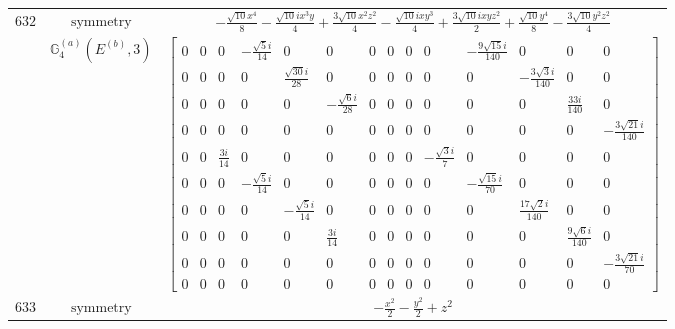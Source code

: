 \documentclass[fleqn,8pt,landscape]{jsarticle}
\begin{document}
\begin{longtable}{ccc}
$ 632 $ & $ \text{symmetry} $ & $ - \frac{\sqrt{10} x^{4}}{8} - \frac{\sqrt{10} i x^{3} y}{4} + \frac{3 \sqrt{10} x^{2} z^{2}}{4} - \frac{\sqrt{10} i x y^{3}}{4} + \frac{3 \sqrt{10} i x y z^{2}}{2} + \frac{\sqrt{10} y^{4}}{8} - \frac{3 \sqrt{10} y^{2} z^{2}}{4} $ \\
$  $ & $ \mathbb{G}_{4}^{(a)}(E^{(b)},3) $ & $ \begin{bmatrix} 0 & 0 & 0 & - \frac{\sqrt{5} i}{14} & 0 & 0 & 0 & 0 & 0 & 0 & - \frac{9 \sqrt{15} i}{140} & 0 & 0 & 0 \\ 0 & 0 & 0 & 0 & \frac{\sqrt{30} i}{28} & 0 & 0 & 0 & 0 & 0 & 0 & - \frac{3 \sqrt{3} i}{140} & 0 & 0 \\ 0 & 0 & 0 & 0 & 0 & - \frac{\sqrt{6} i}{28} & 0 & 0 & 0 & 0 & 0 & 0 & \frac{33 i}{140} & 0 \\ 0 & 0 & 0 & 0 & 0 & 0 & 0 & 0 & 0 & 0 & 0 & 0 & 0 & - \frac{3 \sqrt{21} i}{140} \\ 0 & 0 & \frac{3 i}{14} & 0 & 0 & 0 & 0 & 0 & 0 & - \frac{\sqrt{3} i}{7} & 0 & 0 & 0 & 0 \\ 0 & 0 & 0 & - \frac{\sqrt{5} i}{14} & 0 & 0 & 0 & 0 & 0 & 0 & - \frac{\sqrt{15} i}{70} & 0 & 0 & 0 \\ 0 & 0 & 0 & 0 & - \frac{\sqrt{5} i}{14} & 0 & 0 & 0 & 0 & 0 & 0 & \frac{17 \sqrt{2} i}{140} & 0 & 0 \\ 0 & 0 & 0 & 0 & 0 & \frac{3 i}{14} & 0 & 0 & 0 & 0 & 0 & 0 & \frac{9 \sqrt{6} i}{140} & 0 \\ 0 & 0 & 0 & 0 & 0 & 0 & 0 & 0 & 0 & 0 & 0 & 0 & 0 & - \frac{3 \sqrt{21} i}{70} \\ 0 & 0 & 0 & 0 & 0 & 0 & 0 & 0 & 0 & 0 & 0 & 0 & 0 & 0 \end{bmatrix} $ \\ \hline
$ 633 $ & $ \text{symmetry} $ & $ - \frac{x^{2}}{2} - \frac{y^{2}}{2} + z^{2} $ \\

\end{longtable}
\end{document}
